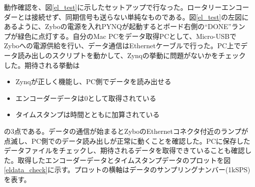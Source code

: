 動作確認を、図\ref{el_test}に示したセットアップで行なった。ロータリーエンコーダーとは接続せず、同期信号も送らない単純なものである。図\ref{el_test}の左図にあるように、Zyboの電源を入れPYNQが起動するとボード右側の``DONE''ランプが緑色に点灯する。自分のMac PCをデータ取得PCとして、Micro-USBでZyboへの電源供給を行い、データ通信はEthernetケーブルで行った。PC上でデータ読み出しのスクリプトを動かして、Zynqの挙動に問題がないかをチェックした。期待される挙動は
\begin{itemize}
  \item Zynqが正しく機能し、PC側でデータを読み出せる
  \item エンコーダーデータは0として取得されている
  \item タイムスタンプは時間とともに加算されている
\end{itemize}
の3点である。データの通信が始まるとZyboのEthernetコネクタ付近のランプが点滅し、PC側でのデータ読み出しが正常に動くことを確認した。PCに保存したデータファイルをチェックし、期待されるデータを取得できていることも確認した。取得したエンコーダーデータとタイムスタンプデータのプロットを図\ref{eldata_check}に示す。プロットの横軸はデータのサンプリングナンバー(1kSPS)を表す。

